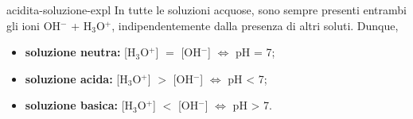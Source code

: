 \documentclass[preview]{standalone}
\begin{document}
\begin{snippet}{acidita-soluzione-expl}
    In tutte le soluzioni acquose, sono sempre presenti
    entrambi gli ioni OH\({}^-\) + H\({}_3\)O\({}^+\),
    indipendentemente dalla presenza di altri soluti.
    Dunque,
    \begin{itemize}
        \item \textbf{soluzione neutra:} [H\({}_3\)O\({}^+\)] \(=\) [OH\({}^-\)]
            \(\iff\) pH = 7;
        \item \textbf{soluzione acida:} [H\({}_3\)O\({}^+\)] \(>\) [OH\({}^-\)]
            \(\iff\) pH < 7;
        \item \textbf{soluzione basica:} [H\({}_3\)O\({}^+\)] \(<\) [OH\({}^-\)]
            \(\iff\) pH > 7.
    \end{itemize}
\end{snippet}
\end{document}
